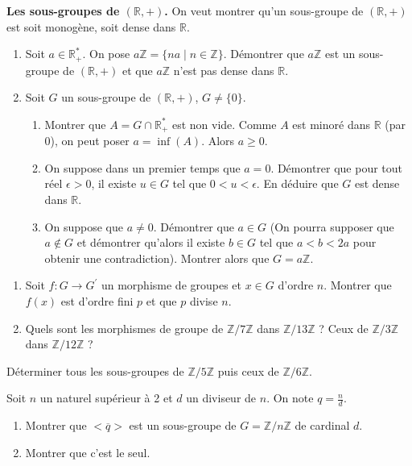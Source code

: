 \begin{exercice}
\textbf{Les sous-groupes de $(\mathbb{R},+)$.}
On veut montrer qu'un sous-groupe de $(\mathbb{R}, +)$ est soit monogène, soit dense dans $\mathbb{R}$.
\begin{enumerate}
    \item Soit $a\in\mathbb{R}_{+}^*$. On pose $a\mathbb{Z}=\{na \mid n\in\mathbb{Z}\}$. Démontrer que $a\mathbb{Z}$ est un sous-groupe de $(\mathbb{R},+)$ et que $a\mathbb{Z}$ n'est pas dense dans $\mathbb{R}$.
    \item Soit $G$ un sous-groupe de $(\mathbb{R}, +)$, $G\ne\{0\}$.
    \begin{enumerate}
        \item Montrer que $A=G\cap\mathbb{R}_{+}^{*}$ est non vide. Comme $A$ est minoré dans $\mathbb{R}$ (par 0), on peut poser $a=\inf(A)$. Alors $a\ge0$.
        \item On suppose dans un premier temps que $a=0$. Démontrer que pour tout réel $\epsilon>0$, il existe $u\in G$ tel que $0<u<\epsilon$. En déduire que $G$ est dense dans $\mathbb{R}$.
        \item On suppose que $a\ne0$. Démontrer que $a\in G$ (On pourra supposer que $a \notin G$ et démontrer qu'alors il existe $b\in G$ tel que $a<b<2a$ pour obtenir une contradiction). Montrer alors que $G=a\mathbb{Z}$.
    \end{enumerate}
\end{enumerate}
\end{exercice}

\begin{exercice}
\begin{enumerate}
    \item Soit $f:G\rightarrow G^{\prime}$ un morphisme de groupes et $x\in G$ d'ordre $n$. Montrer que $f(x)$ est d'ordre fini $p$ et que $p$ divise $n$.
    \item Quels sont les morphismes de groupe de $\mathbb{Z}/7\mathbb{Z}$ dans $\mathbb{Z}/13\mathbb{Z}$ ? Ceux de $\mathbb{Z}/3\mathbb{Z}$ dans $\mathbb{Z}/12\mathbb{Z}$ ?
\end{enumerate}
\end{exercice}

\begin{exercice}
Déterminer tous les sous-groupes de $\mathbb{Z}/5\mathbb{Z}$ puis ceux de $\mathbb{Z}/6\mathbb{Z}$.
\end{exercice}

\begin{exercice}
Soit $n$ un naturel supérieur à 2 et $d$ un diviseur de $n$. On note $q=\frac{n}{d}$.
\begin{enumerate}
    \item Montrer que $<\overline{q}>$ est un sous-groupe de $G=\mathbb{Z}/n\mathbb{Z}$ de cardinal $d$.
    \item Montrer que c'est le seul.
\end{enumerate}
\end{exercice}

